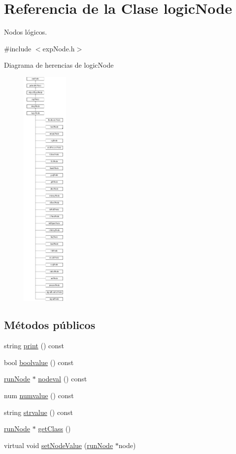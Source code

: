 \hypertarget{classlogicNode}{\section{Referencia de la Clase logic\-Node}
\label{classlogicNode}
}


Nodos lógicos.  




{\ttfamily \#include $<$exp\-Node.\-h$>$}

Diagrama de herencias de logic\-Node\begin{figure}[H]
\begin{center}
\leavevmode
\includegraphics[height=12.000000cm]{classlogicNode}
\end{center}
\end{figure}
\subsection*{Métodos públicos}
\begin{DoxyCompactItemize}
\item 
string \hyperlink{classlogicNode_ab1bacd493fc9e6f302b0f4ee3ed86c55}{print} () const 
\item 
bool \hyperlink{classlogicNode_a802078f6b9ec9f96e01c91ac1704099b}{boolvalue} () const 
\item 
\hyperlink{classrunNode}{run\-Node} $\ast$ \hyperlink{classlogicNode_a5d3aa05d5ff8fe189e1aae007ea2118c}{nodeval} () const 
\item 
num \hyperlink{classlogicNode_a8fbc68e3cd354745e0e34ab4027bb8cc}{numvalue} () const 
\item 
string \hyperlink{classlogicNode_a5a5daf0f2b1295126998ac3a9fe0cc77}{strvalue} () const 
\item 
\hyperlink{classrunNode}{run\-Node} $\ast$ \hyperlink{classlogicNode_ae7ba9985382ad86048f9c82b3c742147}{get\-Class} ()
\item 
virtual void \hyperlink{classlogicNode_a6d3f6e8397d9d0b51b97d681b8380342}{set\-Node\-Value} (\hyperlink{classrunNode}{run\-Node} $\ast$node)
\end{DoxyCompactItemize}
